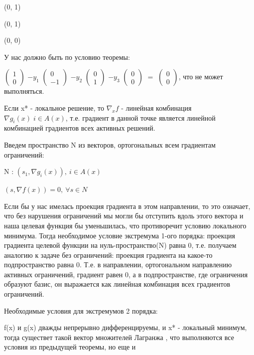 \documentclass[a4paper, 12pt]{article}
\begin{document}
	(0, 1)
	
	(0, 1)
	
	(0, 0)
	
	У нас должно быть по условию теоремы:
	
	$
	\begin{pmatrix}
		1\\
		0
	\end{pmatrix}
	$
	$-y_1$
	$
	\begin{pmatrix}
		0\\
		-1
	\end{pmatrix}
	$
	$-y_2$
	$
	\begin{pmatrix}
		0\\
		1
	\end{pmatrix}
	$
	$-y_3$
	$
	\begin{pmatrix}
		0\\
		0
	\end{pmatrix}
	$
	$=$
	$
	\begin{pmatrix}
		0\\
		0
	\end{pmatrix}
	$, что не может выполняться.
	
	Если x* - локальное решение, то $\nabla_x f$ - линейная комбинация $\nabla g_i(x)\; i \in A(x)$, т.е. градиент в данной точке является линейной комбинацией градиентов всех активных решений.
	
	Введем пространство N из векторов, ортогональных всем градиентам ограничений:
	
	N : $(s_1, \nabla g_i(x)),  \: i \in A(x)$
	
	$(s, \nabla f(x)) = 0,   \: \forall s  \in N$
	
	Если бы у нас имелась проекция градиента в этом направлении, то это означает, что без нарушения ограничений мы могли бы отступить вдоль этого вектора и наша целевая функция бы уменьшилась, что противоречит условию локального минимума.
	Тогда необходимое условие экстремума 1-ого порядка: проекция градиента целевой функции на нуль-пространство(N) равна 0, т.е. получаем аналогию к задаче без ограничений: проекция градиента на какое-то подпространство равна 0. Т.е. в направлении, ортогональном направлению активных ограничений, градиент равен 0, а в подпространстве, где ограничения образуют базис, он выражается как линейная комбинация всех градиентов ограничений.
	
	Необходимые условия для экстремумов 2 порядка:
	
	f(x) и g(x) дважды непрерывно дифференцируемы, и x* - локальный минимум, тогда существет такой вектор множителей Лагранжа , что выполняются все условия из предыдущей теоремы, но еще  и 
	
\end{document}
